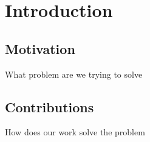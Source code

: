 \chapter{Introduction}
\section{Motivation}
What problem are we trying to solve
\section{Contributions}
How does our work solve the problem
